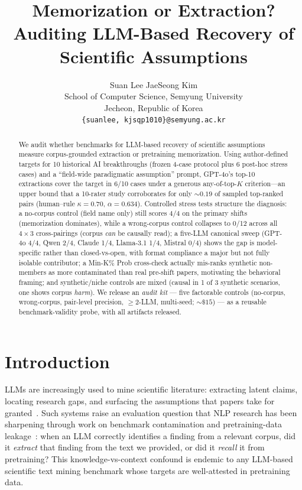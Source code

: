 \documentclass[11pt]{article}
\title{Memorization or Extraction? Auditing LLM-Based Recovery of Scientific Assumptions}
\author{Suan Lee \quad JaeSeong Kim \\
  School of Computer Science, Semyung University \\
  Jecheon, Republic of Korea \\
  \texttt{\{suanlee, kjsqp1010\}@semyung.ac.kr}}
\begin{document}
\maketitle

\begin{abstract}
We audit whether benchmarks for LLM-based recovery of scientific assumptions measure corpus-grounded extraction or pretraining memorization. Using author-defined targets for 10 historical AI breakthroughs (frozen 4-case protocol plus 6 post-hoc stress cases) and a ``field-wide paradigmatic assumption'' prompt, GPT-4o's top-10 extractions cover the target in 6/10 cases under a generous any-of-top-$K$ criterion---an upper bound that a 10-rater study corroborates for only ${\sim}0.19$ of sampled top-ranked pairs (human--rule $\kappa{=}0.70$, $\alpha{=}0.634$). Controlled stress tests structure the diagnosis: a no-corpus control (field name only) still scores 4/4 on the primary shifts (memorization dominates), while a wrong-corpus control collapses to 0/12 across all $4{\times}3$ cross-pairings (corpus \emph{can} be causally read); a five-LLM canonical sweep (GPT-4o 4/4, Qwen 2/4, Claude 1/4, Llama-3.1 1/4, Mistral 0/4) shows the gap is model-specific rather than closed-vs-open, with format compliance a major but not fully isolable contributor; a Min-K\% Prob cross-check actually mis-ranks synthetic non-members as more contaminated than real pre-shift papers, motivating the behavioral framing; and synthetic/niche controls are mixed (causal in 1 of 3 synthetic scenarios, one shows corpus \emph{harm}). We release an \emph{audit kit} --- five factorable controls (no-corpus, wrong-corpus, pair-level precision, ${\geq}2$-LLM, multi-seed; ${\sim}\$15$) --- as a reusable benchmark-validity probe, with all artifacts released.
\end{abstract}

\section{Introduction}

LLMs are increasingly used to mine scientific literature: extracting latent claims, locating research gaps, and surfacing the assumptions that papers take for granted~\cite{wang2024scimon,baek2024researchagent,si2024ideas,pu2024ideasynth,hu2024nova,kargupta2026catalyst}. Such systems raise an evaluation question that NLP research has been sharpening through work on benchmark contamination and pretraining-data leakage~\cite{roberts2023contamination,golchin2024timetravel,magar2022exploitation,sainz2023nlp,shi2024minkpct,duan2024mia,oren2024provable,dong2024leakage}: when an LLM correctly identifies a finding from a relevant corpus, did it \emph{extract} that finding from the text we provided, or did it \emph{recall} it from pretraining? This knowledge-vs-context confound is endemic to any LLM-based scientific text mining benchmark whose targets are well-attested in pretraining data.
\end{document}
